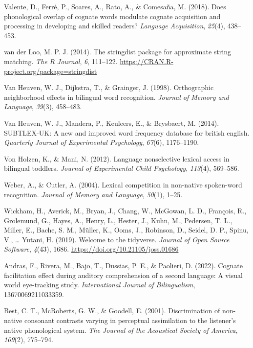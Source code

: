 \documentclass[
]{article}
\newlength{\cslhangindent}
\newenvironment{CSLReferences}[2] %
 {\begin{list}{}{%
  \setlength{\itemindent}{0pt}
  \setlength{\leftmargin}{0pt}
  \setlength{\parsep}{0pt}
  \ifodd #1
   \setlength{\leftmargin}{\cslhangindent}
   \setlength{\itemindent}{-1\cslhangindent}
  \fi
  \setlength{\itemsep}{#2\baselineskip}}}
 {\end{list}}
\begin{document}
\begin{CSLReferences}{1}{0}
Valente, D., Ferré, P., Soares, A., Rato, A., \& Comesaña, M. (2018).
Does phonological overlap of cognate words modulate cognate acquisition
and processing in developing and skilled readers? \emph{Language
Acquisition}, \emph{25}(4), 438--453.

van der Loo, M. P. J. (2014). The stringdist package for approximate
string matching. \emph{The {R} {J}ournal}, \emph{6}, 111--122.
\url{https://CRAN.R-project.org/package=stringdist}

Van Heuven, W. J., Dijkstra, T., \& Grainger, J. (1998). Orthographic
neighborhood effects in bilingual word recognition. \emph{Journal of
Memory and Language}, \emph{39}(3), 458--483.

Van Heuven, W. J., Mandera, P., Keuleers, E., \& Brysbaert, M. (2014).
SUBTLEX-UK: A new and improved word frequency database for british
english. \emph{Quarterly Journal of Experimental Psychology},
\emph{67}(6), 1176--1190.

Von Holzen, K., \& Mani, N. (2012). Language nonselective lexical access
in bilingual toddlers. \emph{Journal of Experimental Child Psychology},
\emph{113}(4), 569--586.

Weber, A., \& Cutler, A. (2004). Lexical competition in non-native
spoken-word recognition. \emph{Journal of Memory and Language},
\emph{50}(1), 1--25.

Wickham, H., Averick, M., Bryan, J., Chang, W., McGowan, L. D.,
François, R., Grolemund, G., Hayes, A., Henry, L., Hester, J., Kuhn, M.,
Pedersen, T. L., Miller, E., Bache, S. M., Müller, K., Ooms, J.,
Robinson, D., Seidel, D. P., Spinu, V., \ldots{} Yutani, H. (2019).
Welcome to the {tidyverse}. \emph{Journal of Open Source Software},
\emph{4}(43), 1686. \url{https://doi.org/10.21105/joss.01686}

Andras, F., Rivera, M., Bajo, T., Dussias, P. E., \& Paolieri, D.
(2022). Cognate facilitation effect during auditory comprehension of a
second language: A visual world eye-tracking study. \emph{International
Journal of Bilingualism}, 13670069211033359.

Best, C. T., McRoberts, G. W., \& Goodell, E. (2001). Discrimination of
non-native consonant contrasts varying in perceptual assimilation to the
listener's native phonological system. \emph{The Journal of the
Acoustical Society of America}, \emph{109}(2), 775--794.


\end{CSLReferences}
\end{document}
